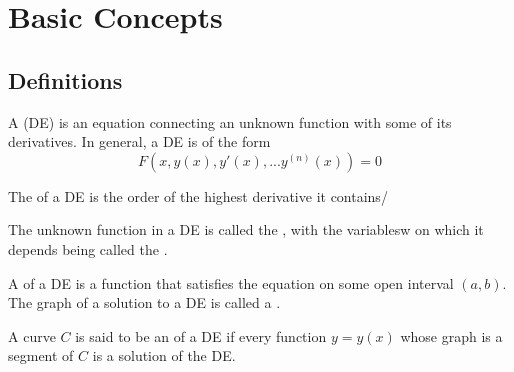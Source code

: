 %
%
%
\chapter{Basic Concepts}
\label{Basic} %


\section{Definitions}

\begin{definition}
        A  (DE) is an equation connecting an unknown function with some of its derivatives. In general, a DE is of the form \begin{equation}
                F(x,y(x),y'(x),...y^{(n)}(x)) = 0
        \end{equation}
\end{definition}


\begin{definition}[Order]
        The  of a DE is the order of the highest derivative it contains/
\end{definition}



\begin{definition}
        The unknown function in a DE is called the , with the variablesw on which it depends being called the .
\end{definition}



\begin{definition}[Solution]
        A  of a DE is a function that satisfies the equation on some open interval $(a,b)$. The graph of a solution to a DE is called a .
\end{definition}





\begin{definition}[Graphs]
        A curve $C$ is said to be an  of a DE if every function $y = y(x)$ whose graph is a segment of $C$ is a solution of the DE.
\end{definition}


